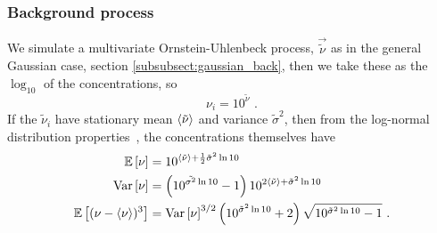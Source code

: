 \subsubsection{Background process}
\label{subsubsect:log-normal_back}
We simulate a multivariate Ornstein-Uhlenbeck process, $\vec{\tilde{\nu}}$ as in the general Gaussian case, section \ref{subsubsect:gaussian_back}, then we take these as the $\log_{10}$ of the concentrations, so 
\begin{equation*}
\nu_i = 10^{\tilde{\nu}} \,\, .
\end{equation*}
If the $\tilde{\nu}_i$ have stationary mean $\braket{\tilde{\nu}}$ and variance $\tilde{\sigma}^2$, then from the log-normal distribution properties~\cite{balakrishnan_handbook_1999}, the concentrations themselves have
\begin{align*}
	\mathbb{E}\left[ \nu \right] &= 10^{\braket{\tilde{\nu}} + \frac12 \tilde{\sigma}^2 \ln{10}}	\\
	\mathrm{Var}\left[ \nu \right] &= \left(10^{\tilde{\sigma^2} \ln{10}} - 1 \right) 10^{2 \braket{\tilde{\nu}} + \tilde{\sigma}^2 \ln{10}}	\\
	\mathbb{E}\left[ (\nu - \braket{\nu})^3 \right] &= \mathrm{Var}\left[ \nu \right]^{3/2} \left(10^{\tilde{\sigma}^2 \ln{10}} + 2\right) \sqrt{10^{\tilde{\sigma}^2 \ln{10}} - 1} \,\, .
\end{align*}


	